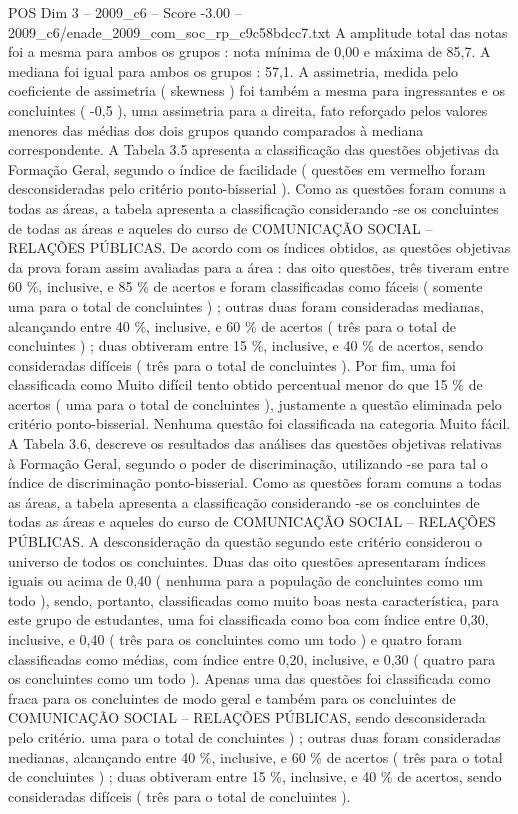\begin{textsample}{POS Dim 3 – 2009\_c6 – Score -3.00 – 2009\_c6/enade\_2009\_com\_soc\_rp\_c9c58bdcc7.txt}
A amplitude total das notas foi a mesma para ambos os grupos : nota mínima de 0,00 e máxima de 85,7.
A mediana foi igual para ambos os grupos : 57,1.
A assimetria, medida pelo coeficiente de assimetria ( skewness ) foi também a mesma para ingressantes e os concluintes ( -0,5 ), uma assimetria para a direita, fato reforçado pelos valores menores das médias dos dois grupos quando comparados à mediana correspondente.
A Tabela 3.5 apresenta a classificação das questões objetivas da Formação Geral, segundo o índice de facilidade ( questões em vermelho foram desconsideradas pelo critério ponto-bisserial ).
Como as questões foram comuns a todas as áreas, a tabela apresenta a classificação considerando -se os concluintes de todas as áreas e aqueles do curso de COMUNICAÇÃO SOCIAL – RELAÇÕES PÚBLICAS.
De acordo com os índices obtidos, as questões objetivas da prova foram assim avaliadas para a área : das oito questões, três tiveram entre 60 \%, inclusive, e 85 \% de acertos e foram classificadas como fáceis ( somente uma para o total de concluintes ) ; outras duas foram consideradas medianas, alcançando entre 40 \%, inclusive, e 60 \% de acertos ( três para o total de concluintes ) ; duas obtiveram entre 15 \%, inclusive, e 40 \% de acertos, sendo consideradas difíceis ( três para o total de concluintes ).
Por fim, uma foi classificada como Muito difícil tento obtido percentual menor do que 15 \% de acertos ( uma para o total de concluintes ), justamente a questão eliminada pelo critério ponto-bisserial.
Nenhuma questão foi classificada na categoria Muito fácil.
A Tabela 3.6, descreve os resultados das análises das questões objetivas relativas à Formação Geral, segundo o poder de discriminação, utilizando -se para tal o índice de discriminação ponto-bisserial.
Como as questões foram comuns a todas as áreas, a tabela apresenta a classificação considerando -se os concluintes de todas as áreas e aqueles do curso de COMUNICAÇÃO SOCIAL – RELAÇÕES PÚBLICAS.
A desconsideração da questão segundo este critério considerou o universo de todos os concluintes.
Duas das oito questões apresentaram índices iguais ou acima de 0,40 ( nenhuma para a população de concluintes como um todo ), sendo, portanto, classificadas como muito boas nesta característica, para este grupo de estudantes, uma foi classificada como boa com índice entre 0,30, inclusive, e 0,40 ( três para os concluintes como um todo ) e quatro foram classificadas como médias, com índice entre 0,20, inclusive, e 0,30 ( quatro para os concluintes como um todo ).
Apenas uma das questões foi classificada como fraca para os concluintes de modo geral e também para os concluintes de COMUNICAÇÃO SOCIAL – RELAÇÕES PÚBLICAS, sendo desconsiderada pelo critério. uma para o total de concluintes ) ; outras duas foram consideradas medianas, alcançando entre 40 \%, inclusive, e 60 \% de acertos ( três para o total de concluintes ) ; duas obtiveram entre 15 \%, inclusive, e 40 \% de acertos, sendo consideradas difíceis ( três para o total de concluintes ).

\end{textsample}
